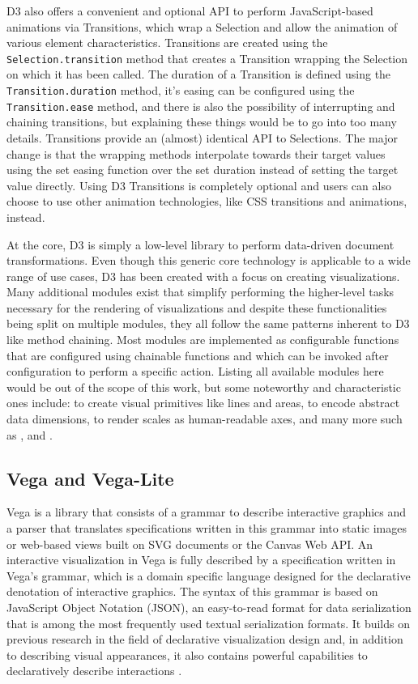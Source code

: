 D3 also offers a convenient and optional API to perform JavaScript-based animations via Transitions, which wrap a Selection and allow the animation of various element characteristics. 
Transitions are created using the \lstinline{Selection.transition} method that creates a Transition wrapping the Selection on which it has been called. 
The duration of a Transition is defined using the \lstinline{Transition.duration} method, it's easing can be configured using the \lstinline{Transition.ease} method, and there is also the possibility of interrupting and chaining transitions, but explaining these things would be to go into too many details. Transitions provide an (almost) identical API to Selections. The major change is that the wrapping methods interpolate towards their target values using the set easing function over the set duration instead of setting the target value directly. Using D3 Transitions is completely optional and users can also choose to use other animation technologies, like CSS transitions and animations, instead.

At the core, D3 is simply a low-level library to perform data-driven document transformations. 
Even though this generic core technology is applicable to a wide range of use cases, D3 has been created with a focus on creating visualizations.
Many additional modules exist that simplify performing the higher-level tasks necessary for the rendering of visualizations and despite these functionalities being split on multiple modules, they all follow the same patterns inherent to D3 like method chaining. 
Most modules are implemented as configurable functions that are configured using chainable functions and which can be invoked after configuration to perform a specific action.
Listing all available modules here would be out of the scope of this work, but some noteworthy and characteristic ones include:  to create visual primitives like lines and areas,  to encode abstract data dimensions,  to render scales as human-readable axes, and many more such as ,  and .

\subsection{Vega and Vega-Lite}

Vega \parencite{Vega} is a library that consists of a grammar to describe interactive graphics and a parser that translates specifications written in this grammar into static images or web-based views built on SVG documents or the Canvas Web API. 
An interactive visualization in Vega is fully described by a specification written in Vega's grammar, which is a domain specific language designed for the declarative denotation of interactive graphics. 
The syntax of this grammar is based on JavaScript Object Notation (JSON), an easy-to-read format for data serialization that is among the most frequently used textual serialization formats. 
It builds on previous research in the field of declarative visualization design \parencite{GrammarOfGraphics} and, in addition to describing visual appearances, it also contains powerful capabilities to declaratively describe interactions \parencite{ReactiveVega}. 

